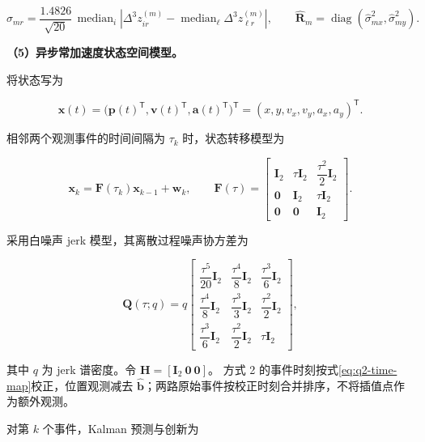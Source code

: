 \begin{equation}
\widehat\sigma_{mr}
=\frac{1.4826}{\sqrt{20}}\,
\operatorname{median}_i
\left|
\Delta^3z_{ir}^{(m)}
-\operatorname{median}_{\ell}\Delta^3z_{\ell r}^{(m)}
\right|,
\qquad
\widehat{\mathbf R}_m
=\operatorname{diag}
(\widehat\sigma_{mx}^2,\widehat\sigma_{my}^2).
\label{eq:q2-measurement-covariance}
\end{equation}

\noindent\textbf{（5）异步常加速度状态空间模型。}

将状态写为

\begin{equation}
\mathbf x(t)=
\bigl(\mathbf p(t)^\mathsf T,
\mathbf v(t)^\mathsf T,
\mathbf a(t)^\mathsf T\bigr)^\mathsf T
=(x,y,v_x,v_y,a_x,a_y)^\mathsf T.
\label{eq:q2-state}
\end{equation}

相邻两个观测事件的时间间隔为 \(\tau_k\) 时，状态转移模型为

\begin{equation}
\mathbf x_k=\mathbf F(\tau_k)\mathbf x_{k-1}+\mathbf w_k,
\qquad
\mathbf F(\tau)=
\begin{bmatrix}
\mathbf I_2&\tau\mathbf I_2&\dfrac{\tau^2}{2}\mathbf I_2\\
\mathbf 0&\mathbf I_2&\tau\mathbf I_2\\
\mathbf 0&\mathbf 0&\mathbf I_2
\end{bmatrix}.
\label{eq:q2-transition}
\end{equation}

采用白噪声 jerk 模型，其离散过程噪声协方差为

\begin{equation}
\mathbf Q(\tau;q)=q
\begin{bmatrix}
\dfrac{\tau^5}{20}\mathbf I_2&
\dfrac{\tau^4}{8}\mathbf I_2&
\dfrac{\tau^3}{6}\mathbf I_2\\
\dfrac{\tau^4}{8}\mathbf I_2&
\dfrac{\tau^3}{3}\mathbf I_2&
\dfrac{\tau^2}{2}\mathbf I_2\\
\dfrac{\tau^3}{6}\mathbf I_2&
\dfrac{\tau^2}{2}\mathbf I_2&
\tau\mathbf I_2
\end{bmatrix},
\label{eq:q2-process-covariance}
\end{equation}

其中 \(q\) 为 jerk 谱密度。令
\(\mathbf H=[\mathbf I_2\ \mathbf 0\ \mathbf 0]\)。
方式 2 的事件时刻按式\eqref{eq:q2-time-map}校正，位置观测减去
\(\widehat{\mathbf b}\)；两路原始事件按校正时刻合并排序，不将插值点作为额外观测。

对第 \(k\) 个事件，Kalman 预测与创新为

